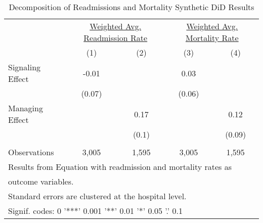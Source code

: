 \begin{table}[ht!]

\caption{\label{tab:MD_noMD_readmort_decomp_synth}Decomposition of Readmissions and Mortality Synthetic DiD Results}
\centering
\begin{tabular}[t]{lcccc}
\toprule
\multicolumn{1}{c}{ } & \multicolumn{2}{c}{\underline{Weighted Avg. Readmission Rate}} & \multicolumn{2}{c}{\underline{Weighted Avg. Mortality Rate}} \\
 & (1) & (2) & (3) & (4)\\
\midrule
Signaling Effect & -0.01 &  & 0.03 & \\
 & (0.07) &  & (0.06) & \\
Managing Effect &  & 0.17 &  & 0.12\\
 &  & (0.1) &  & (0.09)\\
 &  &  &  & \\
Observations & 3,005 & 1,595 & 3,005 & 1,595\\
\bottomrule
\multicolumn{5}{l}{\textsuperscript{} Results from Equation with readmission and mortality rates as}\\
\multicolumn{5}{l}{outcome variables.}\\
\multicolumn{5}{l}{\textsuperscript{} Standard errors are clustered at the hospital level.}\\
\multicolumn{5}{l}{\textsuperscript{} Signif. codes: 0 '***' 0.001 '**' 0.01 '*' 0.05 '.' 0.1}\\
\end{tabular}
\end{table}
